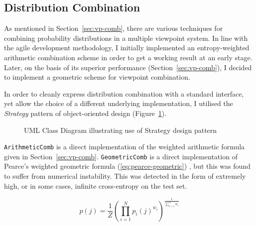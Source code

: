 \documentclass[12pt,a4paper,twoside,openright]{report}
\begin{document}
\subsection{Distribution Combination}

As mentioned in Section~\ref{sec:vp-comb}, there are various techniques for
combining probability distributions in a multiple viewpoint system. In line with
the agile development methodology, I initially implemented an entropy-weighted
arithmetic combination scheme in order to get a working result at an early
stage. Later, on the basis of its superior performance
(Section~\ref{sec:vp-comb}), I decided to implement a geometric scheme for
viewpoint combination.  

In order to cleanly express distribution combination with a standard interface,
yet allow the choice of a different underlying implementation, I utilised the
\emph{Strategy} pattern of object-oriented design
(Figure~\ref{fig:dist-strategy-uml}).

\begin{figure}[H]
\centering
\caption{UML Class Diagram illustrating use of Strategy design pattern}
\label{fig:dist-strategy-uml}
\end{figure}

\texttt{ArithmeticComb} is a direct implementation of the weighted arithmetic
formula given in Section~\ref{sec:vp-comb}. \texttt{GeometricComb} is a direct
implementation of Pearce's weighted geometric formula
(\ref{eq:pearce-geometric}) , but this was found to suffer from numerical
instability. This was detected in the form of extremely high, or in some cases,
infinite cross-entropy on the test set. 

\begin{equation}
p(j) = \frac{1}{Z} \left( \prod_{i = 1}^N p_i(j)^{w_i} \right)^{ \frac{1}{
\sum_{i = 1}^N w_i }} \label{eq:pearce-geometric}
\end{equation}
\end{document}
